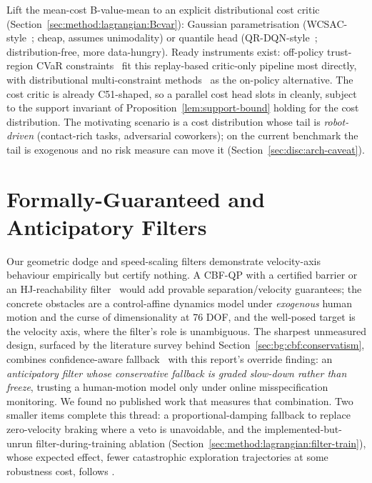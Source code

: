 \documentclass[11pt,a4paper]{report}
\begin{document}
Lift the mean-cost B-value-mean to an explicit distributional cost
critic (Section~\ref{sec:method:lagrangian:Bcvar}): Gaussian
parametrisation (WCSAC-style~\cite{yang2021wcsac}; cheap, assumes
unimodality) or quantile head (QR-DQN-style~\cite{dabney2018qrdqn};
distribution-free, more data-hungry). Ready instruments exist:
off-policy trust-region CVaR constraints~\cite{kim2022offtrc} fit
this replay-based critic-only pipeline most directly, with
distributional multi-constraint methods~\cite{kim2023sdac} as the
on-policy alternative.
The cost critic is already
C51-shaped, so a parallel cost head slots in cleanly, subject to the
support invariant of Proposition~\ref{lem:support-bound} holding for
the cost distribution. The motivating scenario is a cost
distribution whose tail is \emph{robot-driven} (contact-rich tasks,
adversarial coworkers); on the current benchmark the tail is
exogenous and no risk measure can move it
(Section~\ref{sec:disc:arch-caveat}).

\section{Formally-Guaranteed and Anticipatory Filters}
\label{sec:fw:formal}
\label{sec:fw:fallback}
\label{sec:fw:filter-during-training}

Our geometric dodge and speed-scaling filters demonstrate
velocity-axis behaviour empirically but certify nothing. A CBF-QP
with a certified barrier or an HJ-reachability
filter~\cite{bansal2017hamilton,hsu2024safetyfilter} would add provable
separation/velocity guarantees; the concrete obstacles are a
control-affine dynamics model under \emph{exogenous} human motion
and the curse of dimensionality at 76 DOF, and the well-posed target
is the velocity axis, where the filter's role is unambiguous. The
sharpest unmeasured design, surfaced by the literature survey behind
Section~\ref{sec:bg:cbf:conservatism}, combines confidence-aware
fallback~\cite{tian2022confidence} with this report's override
finding: an \emph{anticipatory filter whose conservative fallback is
graded slow-down rather than freeze}, trusting a human-motion model
only under online misspecification monitoring. We found no published
work that measures that combination. Two smaller items complete this thread:
a proportional-damping fallback to replace zero-velocity braking
where a veto is unavoidable, and the implemented-but-unrun
filter-during-training ablation
(Section~\ref{sec:method:lagrangian:filter-train}), whose expected
effect, fewer catastrophic exploration trajectories at some
robustness cost, follows \cite{cbfrl2024,shield2025}.
\end{document}
